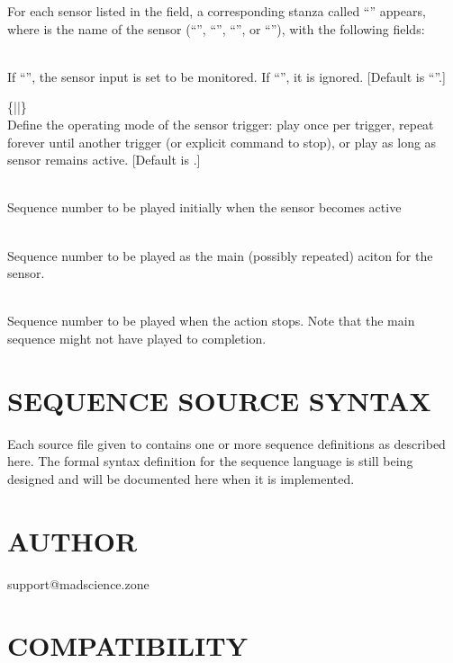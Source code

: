 For each sensor listed in the 
field, a corresponding stanza called 
``''
appears, where 
is the name of the sensor 
(``'',
``'',
``'',
or
``''),
with the following fields:
\begin{list}{}{}
\item[{\codetype{enabled=}\Var*{bool}}]\hfill\\
If 
``'',
the sensor input is set to be monitored.  If
``'',
it is ignored.  [Default is 
``''.]
\item[{\codetype{mode=}\{\codetype{once}|\codetype{repeat}|\codetype{while}\}}]\hfill\\
Define the operating mode of the sensor trigger: play once per trigger,
repeat forever until another trigger (or explicit command to stop), or
play as long as sensor remains active. [Default is 
.]
\item[{\codetype{setup=}\Var*{id}}]\hfill\\
Sequence
number to be played initially when the sensor becomes active
\item[{\codetype{sequence=}\Var*{id}}]\hfill\\
Sequence
number to be played as the main (possibly repeated) aciton for the sensor.
\item[{\codetype{terminate=}\Var*{id}}]\hfill\\
Sequence
number to be played when the action stops. Note that the
main sequence might not have played to completion.
\end{list}
\section*{SEQUENCE SOURCE SYNTAX}


Each source file given to 
contains one or more sequence definitions as described here.  The formal syntax
definition for the sequence language is still being designed and will be documented
here when it is implemented.
\section*{AUTHOR}


support@madscience.zone
\section*{COMPATIBILITY}


